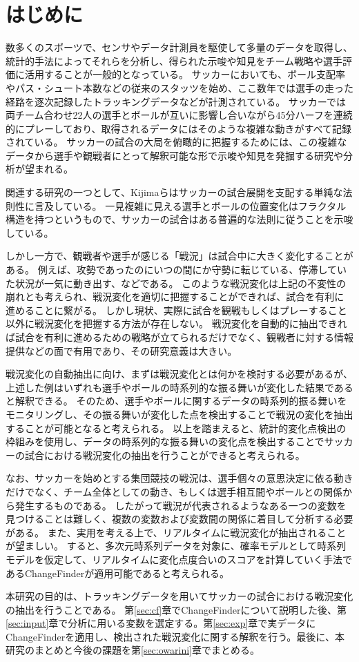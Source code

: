 \section{はじめに}
\label{sec:hajimeni}
数多くのスポーツで、センサやデータ計測員を駆使して多量のデータを取得し、統計的手法によってそれらを分析し、得られた示唆や知見をチーム戦略や選手評価に活用することが一般的となっている。
サッカーにおいても、ボール支配率やパス・シュート本数などの従来のスタッツを始め、ここ数年では選手の走った経路を逐次記録したトラッキングデータなどが計測されている。
サッカーでは両チーム合わせ22人の選手とボールが互いに影響し合いながら45分ハーフを連続的にプレーしており、取得されるデータにはそのような複雑な動きがすべて記録されている。
サッカーの試合の大局を俯瞰的に把握するためには、この複雑なデータから選手や観戦者にとって解釈可能な形で示唆や知見を発掘する研究や分析が望まれる。

関連する研究の一つとして、Kijimaら\cite{kij}はサッカーの試合展開を支配する単純な法則性に言及している。
一見複雑に見える選手とボールの位置変化はフラクタル構造を持つというもので、サッカーの試合はある普遍的な法則に従うことを示唆している。

しかし一方で、観戦者や選手が感じる「戦況」は試合中に大きく変化することがある。
例えば、攻勢であったのにいつの間にか守勢に転じている、停滞していた状況が一気に動き出す、などである。
このような戦況変化は上記の不変性の崩れとも考えられ、戦況変化を適切に把握することができれば、試合を有利に進めることに繋がる。
しかし現状、実際に試合を観戦もしくはプレーすること以外に戦況変化を把握する方法が存在しない。
戦況変化を自動的に抽出できれば試合を有利に進めるための戦略が立てられるだけでなく、観戦者に対する情報提供などの面で有用であり、その研究意義は大きい。

戦況変化の自動抽出に向け、まずは戦況変化とは何かを検討する必要があるが、上述した例はいずれも選手やボールの時系列的な振る舞いが変化した結果であると解釈できる。
そのため、選手やボールに関するデータの時系列的振る舞いをモニタリングし、その振る舞いが変化した点を検出することで戦況の変化を抽出することが可能となると考えられる。
以上を踏まえると、統計的変化点検出\cite{yam_dm}の枠組みを使用し、データの時系列的な振る舞いの変化点を検出することでサッカーの試合における戦況変化の抽出を行うことができると考えられる。

なお、サッカーを始めとする集団競技の戦況は、選手個々の意思決定に依る動きだけでなく、チーム全体としての動き、もしくは選手相互間やボールとの関係から発生するものである。
したがって戦況が代表されるようなある一つの変数を見つけることは難しく、複数の変数および変数間の関係に着目して分析する必要がある。
また、実用を考える上で、リアルタイムに戦況変化が抽出されることが望ましい。
すると、多次元時系列データを対象に、確率モデルとして時系列モデルを仮定して、リアルタイムに変化点度合いのスコアを計算していく手法であるChangeFinder\cite{yam_cf}が適用可能であると考えられる。

本研究の目的は、トラッキングデータを用いてサッカーの試合における戦況変化の抽出を行うことである。
第\ref{sec:cf}章でChangeFinderについて説明した後、第\ref{sec:input}章で分析に用いる変数を選定する。第\ref{sec:exp}章で実データにChangeFinderを適用し、検出された戦況変化に関する解釈を行う。最後に、本研究のまとめと今後の課題を第\ref{sec:owarini}章でまとめる。

